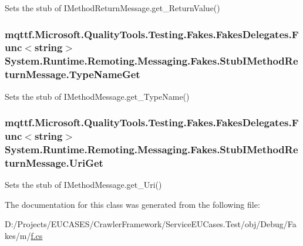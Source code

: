 Sets the stub of I\-Method\-Return\-Message.\-get\-\_\-\-Return\-Value()

\hypertarget{class_system_1_1_runtime_1_1_remoting_1_1_messaging_1_1_fakes_1_1_stub_i_method_return_message_ab1167ca1915e5e3b26319cb96e3021d7}{
\subsubsection[{Type\-Name\-Get}]{\setlength{\rightskip}{0pt plus 5cm}mqttf.\-Microsoft.\-Quality\-Tools.\-Testing.\-Fakes.\-Fakes\-Delegates.\-Func$<$string$>$ System.\-Runtime.\-Remoting.\-Messaging.\-Fakes.\-Stub\-I\-Method\-Return\-Message.\-Type\-Name\-Get}}\label{class_system_1_1_runtime_1_1_remoting_1_1_messaging_1_1_fakes_1_1_stub_i_method_return_message_ab1167ca1915e5e3b26319cb96e3021d7}


Sets the stub of I\-Method\-Message.\-get\-\_\-\-Type\-Name()

\hypertarget{class_system_1_1_runtime_1_1_remoting_1_1_messaging_1_1_fakes_1_1_stub_i_method_return_message_aaa8aa291a9c63bcc66b3df7f7c9f5e0a}{
\subsubsection[{Uri\-Get}]{\setlength{\rightskip}{0pt plus 5cm}mqttf.\-Microsoft.\-Quality\-Tools.\-Testing.\-Fakes.\-Fakes\-Delegates.\-Func$<$string$>$ System.\-Runtime.\-Remoting.\-Messaging.\-Fakes.\-Stub\-I\-Method\-Return\-Message.\-Uri\-Get}}\label{class_system_1_1_runtime_1_1_remoting_1_1_messaging_1_1_fakes_1_1_stub_i_method_return_message_aaa8aa291a9c63bcc66b3df7f7c9f5e0a}


Sets the stub of I\-Method\-Message.\-get\-\_\-\-Uri()



The documentation for this class was generated from the following file\-:\begin{DoxyCompactItemize}
\item 
D\-:/\-Projects/\-E\-U\-C\-A\-S\-E\-S/\-Crawler\-Framework/\-Service\-E\-U\-Cases.\-Test/obj/\-Debug/\-Fakes/m/\hyperlink{m_2f_8cs}{f.\-cs}\end{DoxyCompactItemize}

